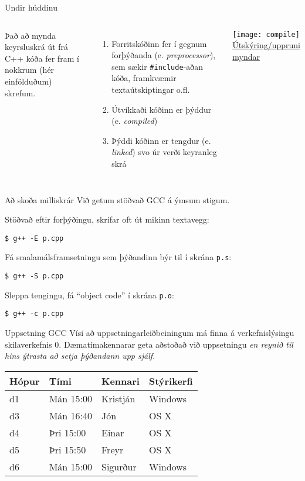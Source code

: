 \documentclass[handout]{beamer}
\begin{document}
\begin{frame}{Undir húddinu}
\begin{columns}
    Það að mynda keyrsluskrá út frá C++ kóða fer fram í nokkrum (hér einfölduðum) skrefum.
    \begin{enumerate}
        \item Forritskóðinn fer í gegnum forþýðanda (e. \emph{preprocessor}), sem sækir \texttt{\#include}-aðan kóða, framkvæmir textaútskiptingar o.fl.
        \item Útvíkkaði kóðinn er þýddur (e. \emph{compiled})
        \item Þýddi kóðinn er tengdur (e. \emph{linked}) svo úr verði keyranleg skrá
    \end{enumerate}
\begin{center}
    \texttt{[image: compile]}\\
    {\tiny \href{http://faculty.cs.niu.edu/~mcmahon/CS241/Notes/compile.html}{Útskýring/uppruni myndar} }
\end{center}
\end{columns}
\end{frame}

\begin{frame}[fragile]{Að skoða milliskrár}
Við getum stöðvað GCC á ýmsum stigum.

Stöðvað eftir forþýðingu, skrifar oft út mikinn textavegg:
\begin{verbatim}
$ g++ -E p.cpp
\end{verbatim}
Fá smalamálsframsetningu sem þýðandinn býr til í skrána \texttt{p.s}:
\begin{verbatim}
$ g++ -S p.cpp
\end{verbatim}
Sleppa tengingu, fá ``object code'' í skrána \texttt{p.o}:
\begin{verbatim}
$ g++ -c p.cpp
\end{verbatim}
\end{frame}

\begin{frame}{Uppsetning GCC}
    Vísi að uppsetningarleiðbeiningum má finna á verkefnislýsingu skilaverkefnis 0. Dæmatímakennarar geta aðstoðað við uppsetningu \emph{en reynið til hins ýtrasta að setja þýðandann upp sjálf.}
    \begin{center}
        \begin{tabular}{llll}
            \toprule
            Hópur&Tími&Kennari&Stýrikerfi\\
            \midrule
            d1&Mán 15:00&Kristján&Windows\\
            d3&Mán 16:40&Jón&OS X\\
            d4&Þri 15:00&Einar&OS X\\
            d5&Þri 15:50&Freyr&OS X\\
            d6&Mán 15:00&Sigurður&Windows\\
            \bottomrule
        \end{tabular}
    \end{center}
\end{frame}
\end{document}
